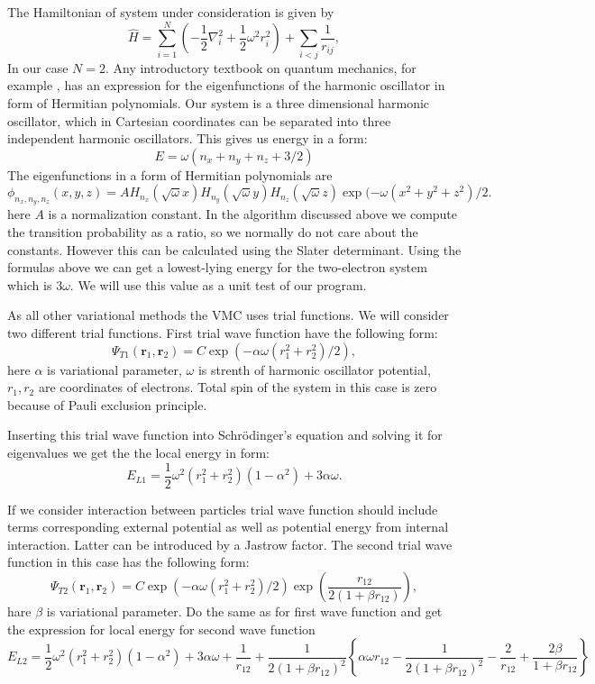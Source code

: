 \documentclass[10pt]{article}
\begin{document}
The Hamiltonian of system under consideration is given by
\begin{equation}
  \label{eq:finalH}
  \hat{H}=\sum_{i=1}^{N} \left(  -\frac{1}{2} \nabla_i^2 + \frac{1}{2} \omega^2r_i^2  \right)+\sum_{i<j}\frac{1}{r_{ij}},
\end{equation}
In our case $N=2$. 
Any introductory textbook on quantum mechanics, for example \cite{Liboff}, has an expression for the eigenfunctions of the harmonic oscillator in form of Hermitian polynomials.  Our system is a three dimensional harmonic oscillator, which in Cartesian coordinates can be separated into three independent harmonic oscillators. This gives us energy in a form:
\begin{equation*}
E=\omega(n_x+n_y+n_z+3/2) 
  \end{equation*}
  The eigenfunctions in a form of Hermitian polynomials are
\begin{equation*}
  \phi_{n_x,n_y,n_z}(x,y,z) = A H_{n_x}(\sqrt{\omega}x)H_{n_y}(\sqrt{\omega}y)H_{n_z}(\sqrt{\omega}z)\exp{(-\omega(x^2+y^2+z^2)/2}.
  \end{equation*}
 here $A$ is a normalization constant. In the algorithm discussed above we compute the transition probability as a ratio, so we normally do not care about the constants. However this can be calculated using the Slater determinant. 
 Using the formulas above we can get a lowest-lying energy for the two-electron system which is $3\omega$. We will use this value as a unit test of our program.

As all other variational methods the VMC uses trial functions. We will consider two different trial functions. 
First trial wave function have the following form:
\[
   \Psi_{T1}(\mathbf{r}_1,\mathbf{r}_2) = C\exp{\left(-\alpha\omega(r_1^2+r_2^2)/2\right)},
\]
here  $\alpha$ is variational parameter, $\omega$ is strenth of harmonic oscillator potential, $r_1, r_2$ are coordinates of electrons. Total spin of the system in this case is zero because of Pauli exclusion principle.

Inserting this trial wave function into Schr\"{o}dinger's equation and solving it for eigenvalues we get the the local energy in form: 
\[ 
E_{L1} = \frac{1}{2}\omega^2\left( r_1^2+r_2^2\right)\left(1-\alpha^2\right) +3\alpha\omega.
\]

If we consider interaction between particles trial wave function should include terms corresponding external potential as well as potential energy from internal interaction. Latter can be introduced by a Jastrow factor.
The second trial wave function in this case has the following form:
\[
    \Psi_{T2}(\mathbf{r}_1,\mathbf{r}_2) =
    C\exp{\left(-\alpha\omega(r_1^2+r_2^2)/2\right)}
    \exp{\left(\frac{r_{12}}{2(1+\beta r_{12})}\right)},
\]
hare $\beta$ is variational parameter.
Do the same as for first wave function and get the expression for local energy for second wave function
\[ 
E_{L2} = \frac{1}{2}\omega^2\left( r_1^2+r_2^2\right)\left(1-\alpha^2\right) +3\alpha\omega+\frac{1}{r_{12}}+\frac{1}{2(1+\beta r_{12})^2} 
\left\{\alpha\omega r_{12}-\frac{1}{2(1+\beta r_{12})^2}-\frac{2}{r_{12}}+\frac{2\beta}{1+\beta r_{12}}\right\}
\]
\end{document}

